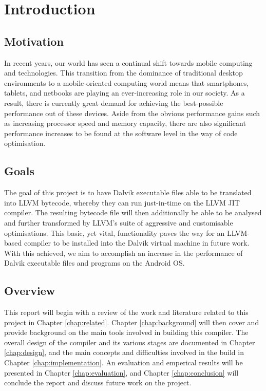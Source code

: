 \chapter{Introduction}

\section{Motivation}

In recent years, our world has seen a continual shift towards mobile computing and technologies. This transition from the dominance of traditional desktop environments to a mobile-oriented computing world means that smartphones, tablets, and netbooks are playing an ever-increasing role in our society. As a result, there is currently great demand for achieving the best-possible performance out of these devices. Aside from the obvious performance gains such as increasing processor speed and memory capacity, there are also significant performance increases to be found at the software level in the way of code optimisation.

\section{Goals}

The goal of this project is to have Dalvik executable files able to be translated into LLVM bytecode, whereby they can run just-in-time on the LLVM JIT compiler. The resulting bytecode file will then additionally be able to be analysed and further transformed by LLVM's suite of aggressive and customisable optimisations. This basic, yet vital, functionality paves the way for an LLVM-based compiler to be installed into the Dalvik virtual machine in future work. With this achieved, we aim to accomplish an increase in the performance of Dalvik executable files and programs on the Android OS.

\section{Overview}

This report will begin with a review of the work and literature related to this project in Chapter \ref{chap:related}. Chapter \ref{chap:background} will then cover and provide background on the main tools involved in building this compiler. The overall design of the compiler and its various stages are documented in Chapter \ref{chap:design}, and the main concepts and difficulties involved in the build in Chapter \ref{chap:implementation}. An evaluation and emperical results will be presented in Chapter \ref{chap:evaluation}, and Chapter \ref{chap:conclusion} will conclude the report and discuss future work on the project.
